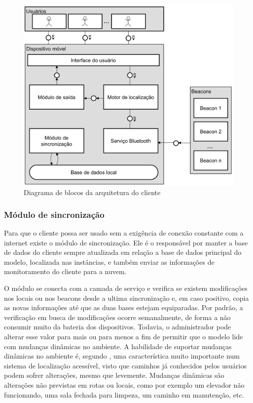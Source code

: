 \documentclass[english,brazilian]{UNISINOSmonografia}
\begin{document}
\begin{figure}[!ht]
	\caption{Diagrama de blocos da arquitetura do cliente}
	\label{fig:arquiteturaCliente}
	\centering%
	\begin{minipage}{.8\textwidth}
		\includegraphics[width=\textwidth]{imgs/arquiteturaCliente.png}
	\end{minipage}
\end{figure}

		\subsubsection{Módulo de sincronização}
Para que o cliente possa ser usado sem a exigência de conexão constante com a internet existe o módulo de sincronização. Ele é o responsável por manter a base de dados do cliente sempre atualizada em relação a base de dados principal do modelo, localizada nas instâncias, e também enviar as informações de monitoramento do cliente para a nuvem.

O módulo se conecta com a camada de serviço e verifica se existem modificações nos locais ou nos beacons desde a ultima sincronização e, em caso positivo, copia as novas informações até que as duas bases estejam equiparadas. Por padrão, a verificação em busca de modificações ocorre semanalmente, de forma a não consumir muito da bateria dos dispositivos. Todavia, o administrador pode alterar esse valor para mais ou para menos a fim de permitir que o modelo lide com mudanças dinâmicas no ambiente. A habilidade de suportar mudanças dinâmicas no ambiente é, segundo , uma característica muito importante num sistema de localização acessível, visto que caminhos já conhecidos pelos usuários podem sofrer alterações, mesmo que levemente. Mudanças dinâmicas são alterações não previstas em rotas ou locais, como por exemplo um elevador não funcionando, uma sala fechada para limpeza, um caminho em manutenção, etc.
\end{document}
